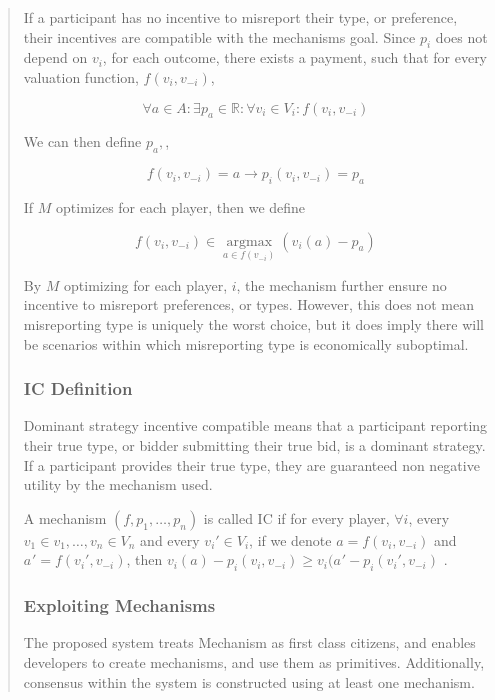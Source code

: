 \documentclass[12pt, titlepage, twocolumn]{report}
\begin{document}
\begin{quotation}
If a participant has no incentive to misreport their type, or preference, their incentives are compatible with the mechanisms goal. Since \(p_i\) does not depend on \(v_i\), for each outcome, there exists a payment, such that for every valuation function, \(f(v_i,v_{-i})\),

\begin{equation}
\forall a \in A : \exists p_a \in \mathbb{R} : \forall v_i \in V_i : f (v_i, v_{-i}) 
\end{equation}

We can then define \(p_a,\),

\begin{equation}
f (v_i, v_{-i}) = a \rightarrow p_i (v_i,v_{-i}) = p_a 
\end{equation}

If \(M\) optimizes for each player, then we define

\begin{equation}
f(v_i, v_{-i}) \in \operatorname*{argmax}_{  a \in f(v_{-i})  } (v_i(a) - p_a)
\end{equation}

By \(M\) optimizing for each player, \(i\), the mechanism further ensure no incentive to misreport preferences, or types. However, this does not mean misreporting type is uniquely the worst choice, but it does imply there will be scenarios within which misreporting type is economically suboptimal.

\subsubsection{IC Definition}
Dominant strategy incentive compatible means that a participant reporting their true type, or bidder submitting their true bid, is a dominant strategy. If a participant provides their true type, they are guaranteed non negative utility by the mechanism used.

A mechanism \((f, p_1, \ldots , p_n)\) is called IC if for every player, \( \forall i \), every \(v_1 \in v_1, \ldots , v_n \in V_n \) and every \(  v_{i}{'} \in V_i \), if we denote \(a = f(v_i,v_{-i})\) and \(a_{}{'} = f(v_{i}{'},v_{-i})\), then \(v_i(a) - p_i(v_i,v_{-i}) \geq v_i(a_{}{'} - p_i(v_{i}{'},v_{-i})\) \cite{ICM}.


\subsubsection{Exploiting Mechanisms}
\indent
The proposed system treats Mechanism as first class citizens, and enables developers to create mechanisms, and use them as primitives. Additionally, consensus within the system is constructed using at least one mechanism.


\end{quotation}
\end{document}
